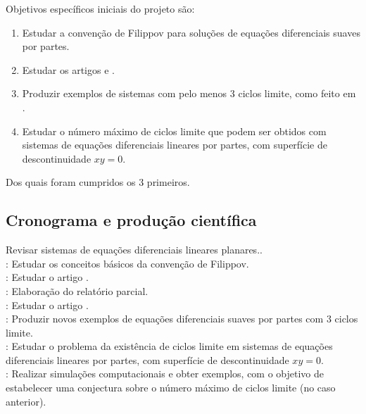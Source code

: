 \documentclass[12pt]{article}
\begin{document}
Objetivos específicos iniciais do projeto são:

\begin{enumerate}
\item Estudar a convenção de Filippov para soluções de equações diferenciais suaves por partes.
\item Estudar os artigos \cite{Huan:etal:2012} e \cite{LilPonce2012}.
\item Produzir exemplos de sistemas com pelo menos 3 ciclos limite, como feito em \cite{Huan:etal:2012}.
\item Estudar o número máximo de ciclos limite que podem ser obtidos com sistemas de equações diferenciais lineares por partes, com superfície de descontinuidade $xy=0$.
\end{enumerate}
Dos quais foram cumpridos os 3 primeiros.
\subsection*{Cronograma e produção científica}
 Revisar sistemas de equações diferenciais lineares planares..\\

: Estudar os conceitos básicos da convenção de Filippov.\\

: Estudar o artigo \cite{Huan:etal:2012}.\\

: Elaboração do relatório parcial.\\

: Estudar o artigo \cite{LilPonce2012}.\\

: Produzir novos exemplos de equações diferenciais suaves por partes com 3 ciclos limite.\\

: Estudar o problema da existência de ciclos limite em sistemas de equações diferenciais lineares por partes, com superfície de descontinuidade $xy=0$.\\

: Realizar simulações computacionais e obter exemplos, com o objetivo de estabelecer uma conjectura sobre o número máximo de ciclos limite (no caso anterior).\\
\end{document}

